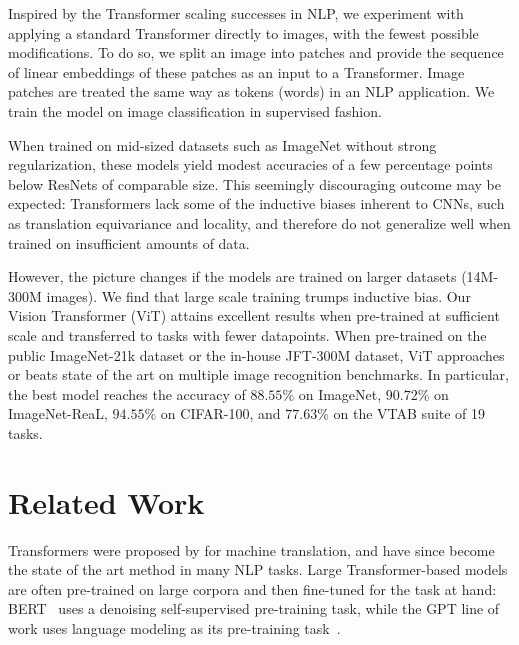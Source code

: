 Inspired by the Transformer scaling successes in NLP, we experiment with applying a standard Transformer directly to images, with the fewest possible modifications. To do so, we split an image into patches and provide the sequence of linear embeddings of these patches as an input to a Transformer. Image patches are treated the same way as tokens (words) in an NLP application. We train the model on image classification in supervised fashion.

When trained on mid-sized datasets such as ImageNet without strong regularization, these models yield modest accuracies of a few percentage points below ResNets of comparable size. This seemingly discouraging outcome may be expected: Transformers lack some of the inductive biases inherent to CNNs, such as translation equivariance and locality, and therefore do not generalize well when trained on insufficient amounts of data.

However, the picture changes if the models are trained on larger datasets (14M-300M images). We find that large scale training trumps inductive bias. Our Vision Transformer (ViT) attains excellent results when pre-trained at sufficient scale and transferred to tasks with fewer datapoints. When pre-trained on the public ImageNet-21k dataset or the in-house JFT-300M dataset, ViT approaches or beats state of the art on multiple image recognition benchmarks. In particular, the best model reaches the accuracy of $88.55\%$ on ImageNet, $90.72\%$ on ImageNet-ReaL, $94.55\%$ on CIFAR-100, and $77.63\%$ on the VTAB suite of 19 tasks.

\section{Related Work}

Transformers were proposed by \citet{vaswani2017} for machine translation, and have since become the state of the art method in many NLP tasks. Large Transformer-based models are often pre-trained on large corpora and then fine-tuned for the task at hand: BERT~\citep{devlin19-bert} uses a denoising self-supervised pre-training task, while the GPT line of work uses language modeling as its pre-training task~\citep{radford2018-gpt,radford2019-gpt2,brown2020-gpt3}.

